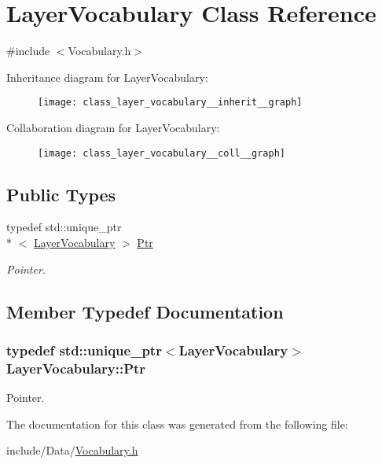 \hypertarget{class_layer_vocabulary}{\section{Layer\-Vocabulary Class Reference}
\label{class_layer_vocabulary}
}


{\ttfamily \#include $<$Vocabulary.\-h$>$}



Inheritance diagram for Layer\-Vocabulary\-:\nopagebreak
\begin{figure}[H]
\begin{center}
\leavevmode
\texttt{[image: class\_layer\_vocabulary\_\_inherit\_\_graph]}
\end{center}
\end{figure}


Collaboration diagram for Layer\-Vocabulary\-:\nopagebreak
\begin{figure}[H]
\begin{center}
\leavevmode
\texttt{[image: class\_layer\_vocabulary\_\_coll\_\_graph]}
\end{center}
\end{figure}
\subsection*{Public Types}
\begin{DoxyCompactItemize}
\item 
typedef std\-::unique\-\_\-ptr\\*
$<$ \hyperlink{class_layer_vocabulary}{Layer\-Vocabulary} $>$ \hyperlink{class_layer_vocabulary_adc324deadcd03d2844a300b98421a39b}{Ptr}
\begin{DoxyCompactList}\small\item\em Pointer. \end{DoxyCompactList}\end{DoxyCompactItemize}


\subsection{Member Typedef Documentation}
\hypertarget{class_layer_vocabulary_adc324deadcd03d2844a300b98421a39b}{
\subsubsection[{Ptr}]{\setlength{\rightskip}{0pt plus 5cm}typedef std\-::unique\-\_\-ptr$<${\bf Layer\-Vocabulary}$>$ {\bf Layer\-Vocabulary\-::\-Ptr}}}\label{class_layer_vocabulary_adc324deadcd03d2844a300b98421a39b}


Pointer. 



The documentation for this class was generated from the following file\-:\begin{DoxyCompactItemize}
\item 
include/\-Data/\hyperlink{_vocabulary_8h}{Vocabulary.\-h}\end{DoxyCompactItemize}
